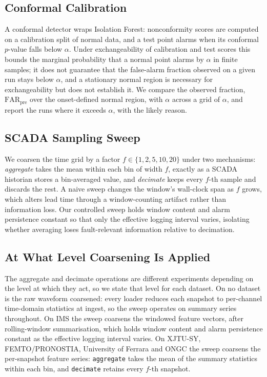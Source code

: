 \documentclass[IJPHM, 2026, 0]{PHMSociety}
\makeatletter
\def\PHMslashbreak{\kern\z@\discretionary{}{}{}}
\makeatother
\begin{document}
\subsection{Conformal Calibration}
A conformal detector \cite{vovk2005algorithmic} wraps Isolation Forest: nonconformity scores are computed on a calibration split of normal data, and a test point alarms when its conformal $p$-value falls below $\alpha$. Under exchangeability of calibration and test scores this bounds the marginal probability that a normal point alarms by $\alpha$ in finite samples; it does not guarantee that the false-alarm fraction observed on a given run stays below $\alpha$, and a stationary normal region is necessary for exchangeability but does not establish it. We compare the observed fraction, $\text{FAR}_{\text{pre}}$ over the onset-defined normal region, with $\alpha$ across a grid of $\alpha$, and report the runs where it exceeds $\alpha$, with the likely reason.

\subsection{SCADA Sampling Sweep}
We coarsen the time grid by a factor $f \in \{1, 2, 5, 10, 20\}$ under two mechanisms: \emph{aggregate} takes the mean within each bin of width $f$, exactly as a SCADA historian stores a bin-averaged value, and \emph{decimate} keeps every $f$-th sample and discards the rest.
A naive sweep changes the window's wall-clock span as $f$ grows, which alters lead time through a window-counting artifact rather than information loss. Our controlled sweep holds window content and alarm persistence constant so that only the effective logging interval varies, isolating whether averaging loses fault-relevant information relative to decimation.

\subsection{At What Level Coarsening Is Applied}
\label{sec:coarsenlevel}
The aggregate and decimate operations are different experiments depending on the level at which they act, so we state that level for each dataset. On no dataset is the raw waveform coarsened: every loader reduces each snapshot to per-channel time-domain statistics at ingest, so the sweep operates on summary series throughout. On IMS the sweep coarsens the windowed feature vectors, after rolling-window summarisation, which holds window content and alarm persistence constant as the effective logging interval varies. On XJTU-SY, FEMTO/\PHMslashbreak PRONOSTIA, University of Ferrara and ONGC the sweep coarsens the per-snapshot feature series: \texttt{aggregate} takes the mean of the summary statistics within each bin, and \texttt{decimate} retains every $f$-th snapshot.
\end{document}
